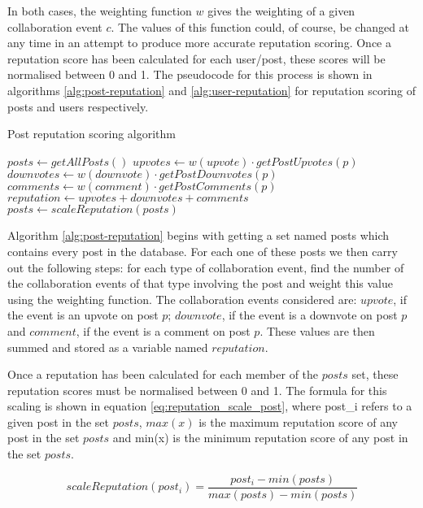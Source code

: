 \noindent
In both cases, the weighting function \(w\) gives the weighting of a given collaboration event \(c\). The values of this function could, of course, be changed at any time in an attempt to produce more accurate reputation scoring. Once a reputation score has been calculated for each user/post, these scores will be normalised between 0 and 1. The pseudocode for this process is shown in algorithms \ref{alg:post-reputation} and \ref{alg:user-reputation} for reputation scoring of posts and users respectively.

\begin{algorithm}[H]
\caption{Post reputation scoring algorithm}
\label{alg:post-reputation}
\begin{algorithmic}[1]
\State $posts\gets getAllPosts()$
	\State $upvotes\gets w(upvote)\cdot getPostUpvotes(p)$
	\State $downvotes\gets w(downvote)\cdot getPostDownvotes(p)$
	\State $comments\gets w(comment)\cdot getPostComments(p)$
	\State $reputation\gets upvotes + downvotes + comments$
\EndFor
\State $posts\gets scaleReputation(posts)$
\end{algorithmic}
\end{algorithm}

\noindent
Algorithm \ref{alg:post-reputation} begins with getting a set named posts which contains every post in the database. For each one of these posts we then carry out the following steps: for each type of collaboration event, find the number of the collaboration events of that type involving the post and weight this value using the weighting function. The collaboration events considered are: \(upvote\), if the event is an upvote on post \(p\); \(downvote\), if the event is a downvote on post \(p\) and \(comment\), if the event is a comment on post \(p\). These values are then summed and stored as a variable named \(reputation\).

Once a reputation has been calculated for each member of the \(posts\) set, these reputation scores must be normalised between 0 and 1. The formula for this scaling is shown in equation \ref{eq:reputation_scale_post}, where post\_i refers to a given post in the set \(posts\), \(max(x)\) is the maximum reputation score of any post in the set \(posts\) and min(x) is the minimum reputation score of any post in the set \(posts\).

\begin{equation}
	\label{eq:reputation_scale_post}
	scaleReputation(post_i) = \frac{post_i - min(posts)}{max(posts) - min(posts)}
\end{equation}

